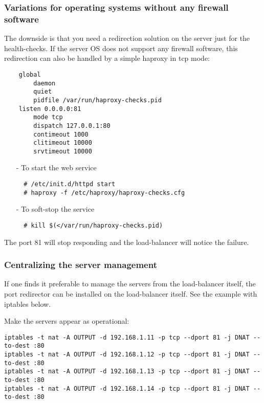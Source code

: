 \subsubsection{Variations for operating systems without any firewall software}

The downside is that you need a redirection solution on the server just for
the health-checks. If the server OS does not support any firewall software,
this redirection can also be handled by a simple haproxy in tcp mode:

\begin{verbatim}
    global
        daemon
        quiet
        pidfile /var/run/haproxy-checks.pid
    listen 0.0.0.0:81
        mode tcp
        dispatch 127.0.0.1:80
        contimeout 1000
        clitimeout 10000
        srvtimeout 10000
\end{verbatim}

\begin{itemize}
\item[-] To start the web service
\begin{verbatim}
  # /etc/init.d/httpd start
  # haproxy -f /etc/haproxy/haproxy-checks.cfg
\end{verbatim}
\item[-] To soft-stop the service
\begin{verbatim}
  # kill $(</var/run/haproxy-checks.pid)
\end{verbatim}
\end{itemize}

The port 81 will stop responding and the load-balancer will notice the failure.

\subsubsection{Centralizing the server management}

If one finds it preferable to manage the servers from the load-balancer itself,
the port redirector can be installed on the load-balancer itself. See the
example with iptables below.

Make the servers appear as operational:
\begin{verbatim}
iptables -t nat -A OUTPUT -d 192.168.1.11 -p tcp --dport 81 -j DNAT --to-dest :80
iptables -t nat -A OUTPUT -d 192.168.1.12 -p tcp --dport 81 -j DNAT --to-dest :80
iptables -t nat -A OUTPUT -d 192.168.1.13 -p tcp --dport 81 -j DNAT --to-dest :80
iptables -t nat -A OUTPUT -d 192.168.1.14 -p tcp --dport 81 -j DNAT --to-dest :80
\end{verbatim}

